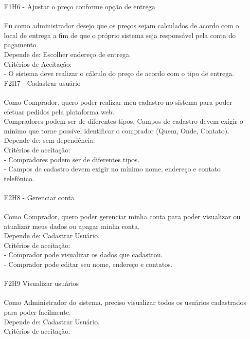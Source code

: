 F1H6 - Ajustar o preço conforme opção de entrega\\
\\
\tab Eu como administrador desejo que os preços sejam calculados de acordo com o local de entrega a fim de que o próprio sistema seja responsável pela conta do pagamento.\\
\tab Depende de: Escolher endereço de entrega.\\
\tab Critérios de Aceitação:\\
\tab - O sistema deve realizar o cálculo do preço de acordo com o tipo de entrega.\\

F2H7 - Cadastrar usuário\\
\\
\tab Como Comprador, quero poder realizar meu cadastro no sistema para poder efetuar pedidos pela plataforma web.\\
\tab Compradores podem ser de diferentes tipos. Campos de cadastro devem exigir o mínimo que torne possível identificar o comprador (Quem, Onde, Contato).\\
\tab Depende de: sem dependência.\\
\tab Critérios de aceitação:\\
\tab - Compradores podem ser de diferentes tipos.\\
\tab - Campos de cadastro devem exigir no mínimo nome, endereço e contato telefônico.\\
\\
F2H8 - Gerenciar conta\\
\\
\tab Como Comprador, quero poder gerenciar minha conta para poder visualizar ou atualizar meus dados ou apagar minha conta.\\
\tab Depende de: Cadastrar Usuário.\\
\tab Critérios de aceitação:\\
\tab - Comprador pode visualizar os dados que cadastrou.\\
\tab - Comprador pode editar seu nome, endereço e contatos.\\
\\
F2H9 Visualizar usuários\\
\\
\tab Como Administrador do sistema, preciso visualizar todos os usuários cadastrados para poder facilmente.\\
\tab Depende de: Cadastrar Usuário.\\
\tab Critérios de aceitação:\\
